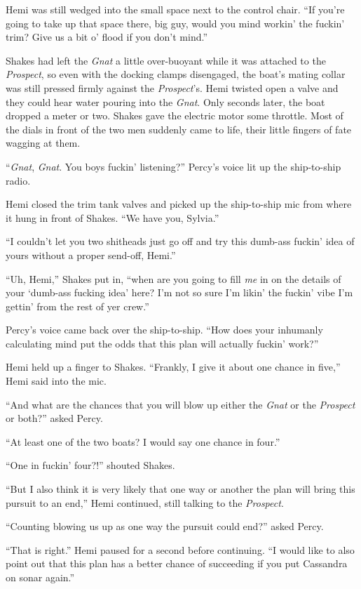 \documentclass[
]{scrbook}
\begin{document}
Hemi was still wedged into the small space next to the control chair.
``If you're going to take up that space there, big guy, would you mind
workin' the fuckin' trim? Give us a bit o' flood if you don't mind.''

Shakes had left the \emph{Gnat} a little over-buoyant while it was
attached to the \emph{Prospect}, so even with the docking clamps
disengaged, the boat's mating collar was still pressed firmly against
the \emph{Prospect}'s. Hemi twisted open a valve and they could hear
water pouring into the \emph{Gnat}. Only seconds later, the boat dropped
a meter or two. Shakes gave the electric motor some throttle. Most of
the dials in front of the two men suddenly came to life, their little
fingers of fate wagging at them.

``\emph{Gnat}, \emph{Gnat}. You boys fuckin' listening?'' Percy's voice
lit up the ship-to-ship radio.

Hemi closed the trim tank valves and picked up the ship-to-ship mic from
where it hung in front of Shakes. ``We have you, Sylvia.''

``I couldn't let you two shitheads just go off and try this dumb-ass
fuckin' idea of yours without a proper send-off, Hemi.''

``Uh, Hemi,'' Shakes put in, ``when are you going to fill \emph{me} in
on the details of your `dumb-ass fucking idea' here? I'm not so sure I'm
likin' the fuckin' vibe I'm gettin' from the rest of yer crew.''

Percy's voice came back over the ship-to-ship. ``How does your inhumanly
calculating mind put the odds that this plan will actually fuckin'
work?''

Hemi held up a finger to Shakes. ``Frankly, I give it about one chance
in five,'' Hemi said into the mic.

``And what are the chances that you will blow up either the \emph{Gnat}
or the \emph{Prospect} or both?'' asked Percy.

``At least one of the two boats? I would say one chance in four.''

``One in fuckin' four?!'' shouted Shakes.

``But I also think it is very likely that one way or another the plan
will bring this pursuit to an end,'' Hemi continued, still talking to
the \emph{Prospect}.

``Counting blowing us up as one way the pursuit could end?'' asked
Percy.

``That is right.'' Hemi paused for a second before continuing. ``I would
like to also point out that this plan has a better chance of succeeding
if you put Cassandra on sonar again.''
\end{document}
